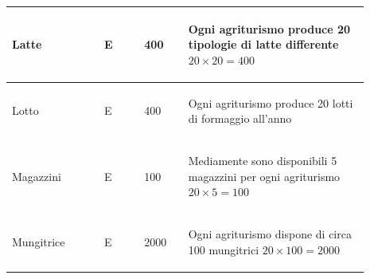 \documentclass[12pt,a4paper]{article}
\begin{document}
\begin{center}
\begin{longtable}{|p{0.23\linewidth}|p{0.1\linewidth}|p{0.11\linewidth}|p{0.45\linewidth}|}
\hline
Latte 				& \begin{center}
\vspace{-25pt}E
\end{center}
					& \begin{center}
					\vspace{-25pt}400\end{center}
					& \begin{flushleft}\vspace{-25pt} Ogni agriturismo produce 20 tipologie di latte differente $20\times 20 = 400$\end{flushleft}\\ 

\hline
Lotto 				& \begin{center}
\vspace{-25pt}E
\end{center}
					& \begin{center}
					\vspace{-25pt}400\end{center}
					& \begin{flushleft}\vspace{-25pt} Ogni agriturismo produce 20 lotti di formaggio all'anno \end{flushleft}\\ 

\hline
Magazzini 				& \begin{center}
\vspace{-25pt}E
\end{center}
					& \begin{center}
					\vspace{-25pt}100\end{center}
					& \begin{flushleft}\vspace{-25pt} Mediamente sono disponibili 5 magazzini per ogni agriturismo $20\times 5 = 100$ \end{flushleft}\\ 

\hline
Mungitrice 				& \begin{center}
\vspace{-25pt}E
\end{center}
					& \begin{center}
					\vspace{-25pt}2000\end{center}
					& \begin{flushleft}\vspace{-25pt} Ogni agriturismo dispone di circa 100 mungitrici $20\times 100= 2000$ \end{flushleft}\\ 


\end{longtable}
\end{center}
\end{document}

